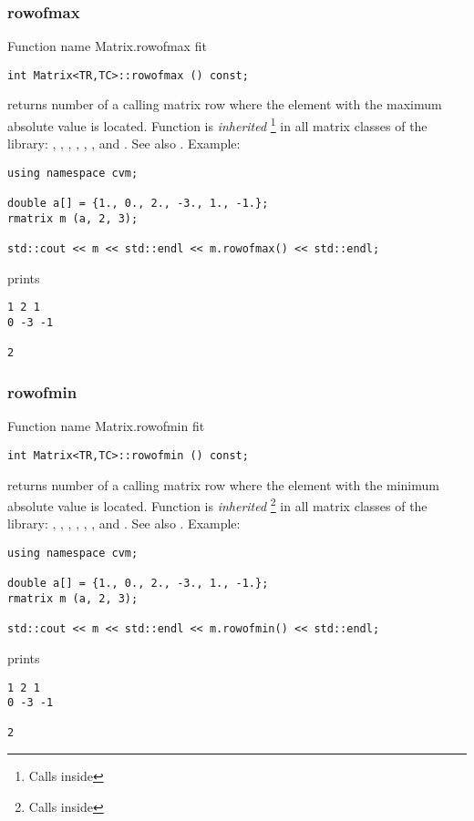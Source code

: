 \subsubsection{rowofmax}
Function%
\pdfdest name {Matrix.rowofmax} fit
\begin{verbatim}
int Matrix<TR,TC>::rowofmax () const;
\end{verbatim}
returns  \Based number of a calling matrix row
where the element with the maximum absolute value is located.
Function is \emph{inherited}%
\footnote{Calls  inside}
in all matrix classes
of the library:
,   ,
, ,
, ,
 and .
See also .
Example:
\begin{Verbatim}
using namespace cvm;

double a[] = {1., 0., 2., -3., 1., -1.};
rmatrix m (a, 2, 3);

std::cout << m << std::endl << m.rowofmax() << std::endl;
\end{Verbatim}
prints
\begin{Verbatim}
1 2 1
0 -3 -1

2
\end{Verbatim}
\newpage




\subsubsection{rowofmin}
Function%
\pdfdest name {Matrix.rowofmin} fit
\begin{verbatim}
int Matrix<TR,TC>::rowofmin () const;
\end{verbatim}
returns  \Based number of a calling matrix row
where the element with the minimum absolute value is located.
Function is \emph{inherited}%
\footnote{Calls  inside}
in all matrix classes
of the library:
,   ,
, ,
, ,
 and .
See also .
Example:
\begin{Verbatim}
using namespace cvm;

double a[] = {1., 0., 2., -3., 1., -1.};
rmatrix m (a, 2, 3);

std::cout << m << std::endl << m.rowofmin() << std::endl;
\end{Verbatim}
prints
\begin{Verbatim}
1 2 1
0 -3 -1

2
\end{Verbatim}
\newpage




